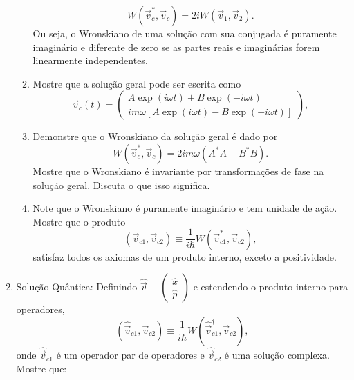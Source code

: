 \begin{enumerate}
\begin{enumerate}
                    \begin{equation*}
                        W(\vec{v}_c^*, \vec{v}_c) = 2iW(\vec{v}_1, \vec{v}_2).
                    \end{equation*}
                    Ou seja, o Wronskiano de uma solução com sua conjugada é puramente
                    imaginário e diferente de zero se as partes reais e imaginárias forem
                    linearmente independentes.
              \item Mostre que a solução geral pode ser escrita como
                    \begin{equation*}
                        \vec{v}_c(t) = \begin{pmatrix} A \exp(i\omega t) + B \exp(-i\omega t) \\
                            im\omega \left[A \exp(i\omega t) - B \exp(-i\omega t)\right]\end{pmatrix},
                    \end{equation*}
              \item Demonstre que o Wronskiano da solução geral é dado por
                    \begin{equation*}
                        W(\vec{v}_c^*, \vec{v}_c) = 2im\omega\left(A^*A - B^*B\right).
                    \end{equation*}
                    Mostre que o Wronskiano é invariante por transformações de fase
                    na solução geral. Discuta o que isso significa.
              \item Note que o Wronskiano é puramente imaginário e tem unidade de ação. Mostre que o produto
                    $$\left(\vec{v}_{c1}, \vec{v}_{c2}\right) \equiv \frac{1}{i\hbar}W(\vec{v}_{c1}^*, \vec{v}_{c2}),$$
                    satisfaz todos os axiomas de um produto interno, exceto a positividade.
          \end{enumerate}
    \item Solução Quântica: Definindo $\hat{\vec{v}} \equiv \begin{pmatrix} \hat{x} \\
                  \hat{p}\end{pmatrix}$ e estendendo o produto interno para operadores,
          $$\left(\hat{\vec{v}}_{c1}, \vec{v}_{c2}\right) \equiv
              \frac{1}{i\hbar}W(\hat{\vec{v}}_{c1}^\dagger, \vec{v}_{c2}),$$ onde
          $\hat{\vec{v}}_{c1}$ é um operador par de operadores e $\hat{\vec{v}}_{c2}$ é
          uma solução complexa. Mostre que:
          \begin{enumerate}

\end{enumerate}
\end{enumerate}

